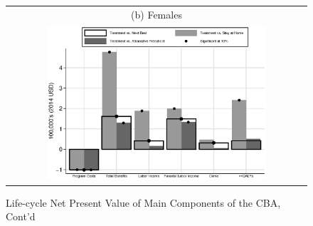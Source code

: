 \documentclass[static]{JJH-Beamer}
\begin{document}
\begin{figure}[H]
\addtocounter{figure}{-1}
\caption{Life-cycle Net Present Value of Main Components of the CBA, Cont'd}\label{fig:npvsgender}
\begin{center}
\begin{tabular}{c}
(b) Females\\
\includegraphics[width=0.75\textwidth]{output/abccare_npvs1.eps}
\end{tabular}
\end{center}
\end{figure}

\clearpage
\end{document}
